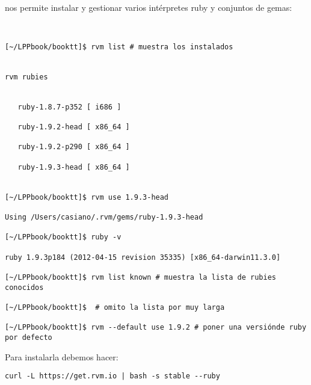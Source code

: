  nos permite instalar y gestionar varios intérpretes ruby y conjuntos de gemas:

\begin{verbatim}
 

[~/LPPbook/booktt]$ rvm list # muestra los instalados


rvm rubies


   ruby-1.8.7-p352 [ i686 ]

   ruby-1.9.2-head [ x86_64 ]

   ruby-1.9.2-p290 [ x86_64 ]

   ruby-1.9.3-head [ x86_64 ]


[~/LPPbook/booktt]$ rvm use 1.9.3-head

Using /Users/casiano/.rvm/gems/ruby-1.9.3-head

[~/LPPbook/booktt]$ ruby -v

ruby 1.9.3p184 (2012-04-15 revision 35335) [x86_64-darwin11.3.0]

[~/LPPbook/booktt]$ rvm list known # muestra la lista de rubies conocidos

[~/LPPbook/booktt]$  # omito la lista por muy larga

[~/LPPbook/booktt]$ rvm --default use 1.9.2 # poner una versiónde ruby por defecto

\end{verbatim}

Para instalarla debemos hacer:

\begin{verbatim}
curl -L https://get.rvm.io | bash -s stable --ruby
\end{verbatim}

